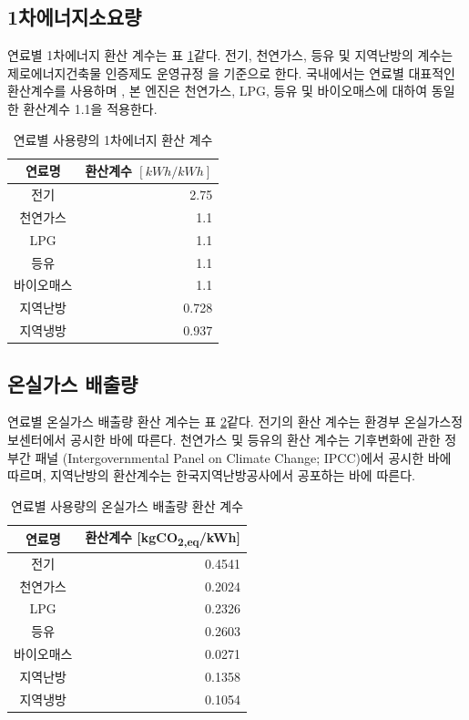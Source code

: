 \subsection{1차에너지소요량}
연료별 1차에너지 환산 계수는 표 \ref{tbl:coeff_kWh_to_1stkWh}\와 같다. 전기, 천연가스, 등유 및 지역난방의 계수는 제로에너지건축물 인증제도 운영규정 \cite{law:energy_to_1stenergy} 을 기준으로 한다. 국내에서는 연료별 대표적인 환산계수를 사용하며 \cite{Jeong2021energydeungkeup}, 본 엔진은 천연가스, LPG, 등유 및 바이오매스에 대하여 동일한 환산계수 1.1을 적용한다.

\begin{table}[ht]
  \caption{연료별 사용량의 1차에너지 환산 계수}
  \label{tbl:coeff_kWh_to_1stkWh}  
  \centering
  \begin{tabular}{cr}
    \toprule
    연료명 & \makecell{환산계수 \\ $[kWh/kWh]$} \\ \midrule
    전기 & 2.75 \\
    천연가스 & 1.1 \\
    LPG & 1.1 \\
    등유 & 1.1 \\
    바이오매스 & 1.1 \\
    지역난방 & 0.728 \\
    지역냉방 & 0.937 \\ \bottomrule
  \end{tabular}
\end{table}

\subsection{온실가스 배출량}

연료별 온실가스 배출량 환산 계수는 표 \ref{tbl:coeff_kWh_to_CO2}\와 같다. 전기의 환산 계수는 환경부 온실가스정보센터에서 공시한 바에 따른다. 천연가스 및 등유의 환산 계수는 기후변화에 관한 정부간 패널 (Intergovernmental Panel on Climate Change; IPCC)에서 공시한 바에 따르며, 지역난방의 환산계수는 한국지역난방공사에서 공포하는 바에 따른다.

\begin{table}[ht]
  \caption{연료별 사용량의 온실가스 배출량 환산 계수}
  \label{tbl:coeff_kWh_to_CO2}  
  \centering
  \begin{tabular}{cr}
    \toprule
    연료명 & 환산계수 [kgCO\textsubscript{2,eq}/kWh] \\ \midrule
    전기 & 0.4541 \\
    천연가스 & 0.2024 \\
    LPG & 0.2326 \\
    등유 & 0.2603 \\
    바이오매스 & 0.0271 \\
    지역난방 & 0.1358 \\
    지역냉방 & 0.1054 \\ \bottomrule
  \end{tabular}
\end{table}

